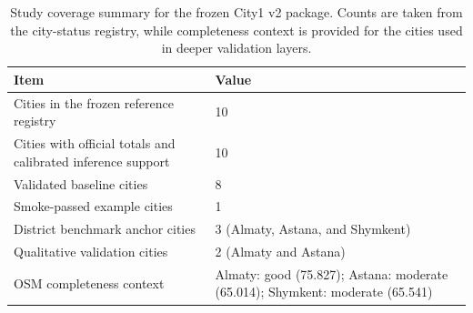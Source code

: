 \begin{table}[H]
\centering
\caption{Study coverage summary for the frozen City1 v2 package. Counts are taken from the city-status registry, while completeness context is provided for the cities used in deeper validation layers.}
\label{tab:study-coverage}
\begin{tabular}{p{}p{}}
\toprule
Item & Value \\
\midrule
Cities in the frozen reference registry & 10 \\
Cities with official totals and calibrated inference support & 10 \\
Validated baseline cities & 8 \\
Smoke-passed example cities & 1 \\
District benchmark anchor cities & 3 (Almaty, Astana, and Shymkent) \\
Qualitative validation cities & 2 (Almaty and Astana) \\
OSM completeness context & Almaty: good (75.827); Astana: moderate (65.014); Shymkent: moderate (65.541) \\
\bottomrule
\end{tabular}
\end{table}
